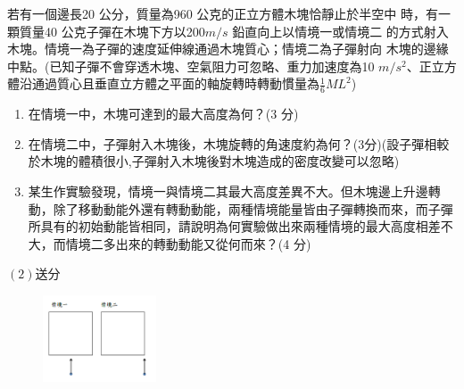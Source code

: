 \documentclass[cn,10pt,math=newtx]{elegantbook}
\begin{document}
\begin{example}
   若有一個邊長20 公分，質量為960 公克的正立方體木塊恰靜止於半空中
時，有一顆質量40 公克子彈在木塊下方以200$m/s$ 鉛直向上以情境一或情境二
的方式射入木塊。情境一為子彈的速度延伸線通過木塊質心；情境二為子彈射向
木塊的邊緣中點。(已知子彈不會穿透木塊、空氣阻力可忽略、重力加速度為10
$m/s^2$、正立方體沿通過質心且垂直立方體之平面的軸旋轉時轉動慣量為$\frac{1}{6} ML^2$)
\begin{enumerate}[label=(\arabic*)] 
  \item 在情境一中，木塊可達到的最大高度為何？(3 分)
  \item 在情境二中，子彈射入木塊後，木塊旋轉的角速度約為何？(3分)(設子彈相較於木塊的體積很小,子彈射入木塊後對木塊造成的密度改變可以忽略)
  \item 某生作實驗發現，情境一與情境二其最大高度差異不大。但木塊邊上升邊轉動，除了移動動能外還有轉動動能，兩種情境能量皆由子彈轉換而來，而子彈所具有的初始動能皆相同，請說明為何實驗做出來兩種情境的最大高度相差不大，而情境二多出來的轉動動能又從何而來？(4 分)
    \end{enumerate}


    \rightline{[台中女中教甄109]}
\end{example}
\begin{solution}
    $(2)送分$
\end{solution}
\begin{figure}[htbp]
    \flushright
    \includegraphics[width=0.3\textwidth]{image/109中女23.png}
  \end{figure}
\newpage
\end{document}
